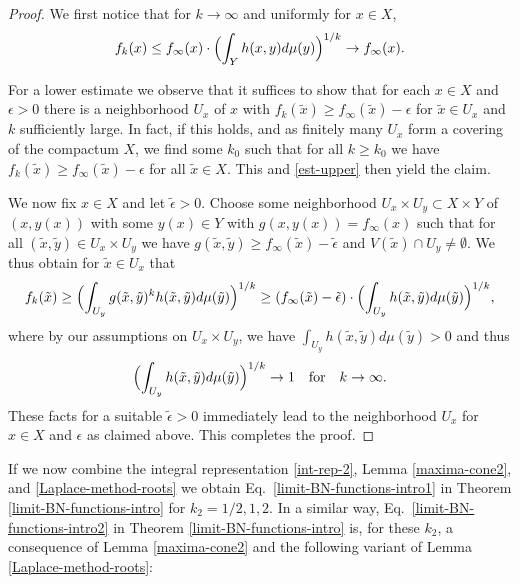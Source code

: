 \documentclass[reqno]{amsart}
\theoremstyle{plain}
\theoremstyle{definition}
\numberwithin{equation}{section}
\begin{document}
\begin{proof}
  We first notice that for $k\to\infty$ and  uniformly for $x\in X$,
  \begin{equation}\label{est-upper}
f_k(x)\le f_{\infty}(x)\cdot \Bigl( \int_Y  h(x,y) d\mu(y) \Bigr)^{1/k} \to f_{\infty}(x).
  \end{equation}

  For a lower estimate we observe that it suffices to show that for each  $x \in X$ and $\epsilon>0$ there is a neighborhood $U_x$
  of $x$ with $f_k(\tilde x)\ge  f_{\infty}(\tilde x)-\epsilon$ for $\tilde x\in U_x$ and $k$ sufficiently large.
  In fact, if this holds, and as finitely many $U_x$ form a covering of the compactum $X$, we find some $k_0$ such that for all $k\ge k_0$ we have
  $f_k(\tilde x)\ge f_{\infty}(\tilde x)-\epsilon$ for all $\tilde x\in X$. This and \eqref{est-upper} then yield the claim.

  We now fix $x\in X$ and let $\tilde\epsilon>0$. Choose some neighborhood $U_x\times U_y\subset X\times Y$ of $(x,y(x))$ with some 
  $y(x)\in Y$ with $g(x,y(x))=f_\infty(x)$ such that for all $(\tilde x,\tilde y)\in U_x\times U_y$ we have
  $g(\tilde x,\tilde y)\ge f_\infty(\tilde x) -\tilde\epsilon$
  and $V(\tilde x)\cap U_y\ne\emptyset$.
  We thus obtain for $\tilde x\in U_x$ that
  $$f_k(\tilde x)\ge \Bigl( \int_{U_y} g(\tilde x, \tilde y)^k   h(\tilde x,\tilde y) d\mu(\tilde y) \Bigr)^{1/k} \ge
  (f_\infty(\tilde x) -\tilde\epsilon)\cdot \Bigl( \int_{U_y} h(\tilde x,\tilde y) d\mu(\tilde y) \Bigr)^{1/k},$$
where by our assumptions on $U_x\times U_y$, we have $\int_{U_y} h(\tilde x,\tilde y) d\mu(\tilde y)>0$ and thus 
$$ \Bigl(\int_{U_y} h(\tilde x,\tilde y) d\mu(\tilde y)\Bigr)^{1/k}\to 1 \quad\text{for} \quad k\to\infty.$$
These facts for a suitable
$\tilde\epsilon>0$ 
immediately lead to the neighborhood $U_x$ for $x\in X$ and $\epsilon$ as claimed above. This completes the proof.
\end{proof}

If we now combine the integral representation \eqref{int-rep-2}, Lemma  \ref{maxima-cone2}, and \ref{Laplace-method-roots} we obtain
Eq.~\eqref{limit-BN-functions-intro1} in Theorem 
\ref{limit-BN-functions-intro} for $k_2=1/2,1,2$.  In a similar way,  Eq.~\eqref{limit-BN-functions-intro2} in Theorem 
\ref{limit-BN-functions-intro} is, for these $k_2$, a consequence of Lemma \ref{maxima-cone2}
and the following variant of  Lemma \ref{Laplace-method-roots}:
\end{document}
